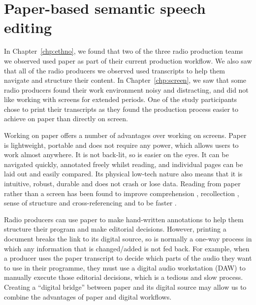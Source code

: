 \chapter{Paper-based semantic speech editing}\label{chp:paper}

In Chapter~\ref{chp:ethno}, we found that two of the three radio production teams we observed used paper as part of
their current production workflow.  We also saw that all of the radio producers we observed used transcripts to help
them navigate and structure their content.  In Chapter~\ref{chp:screen}, we saw that some radio producers found their
work environment noisy and distracting, and did not like working with screens for extended periods.  One of the study
participants chose to print their transcripts as they found the production process easier to achieve on paper than
directly on screen.


Working on paper offers a number of advantages over working on screens.  Paper is lightweight, portable and does not
require any power, which allows users to work almost anywhere.  It is not back-lit, so is easier on the eyes.  It can
be navigated quickly, annotated freely whilst reading, and individual pages can be laid out and easily compared.  Its
physical low-tech nature also means that it is intuitive, robust, durable and does not crash or lose data.  Reading
from paper rather than a screen has been found to improve comprehension \citep{Mangen2013}, recollection
\citep{Singer2017}, sense of structure and cross-referencing \citep{OHara1997} and to be faster \citep{Kurniawan2001}.

Radio producers can use paper to make hand-written annotations to help them structure their program and make editorial
decisions.  However, printing a document breaks the link to its digital source, so is normally a one-way process in
which any information that is changed/added is not fed back.  For example, when a producer uses the paper transcript to
decide which parts of the audio they want to use in their programme, they must use a digital audio workstation (DAW) to
manually execute those editorial decisions, which is a tedious and slow process.  Creating a ``digital bridge'' between
paper and its digital source may allow us to combine the advantages of paper and digital workflows.

